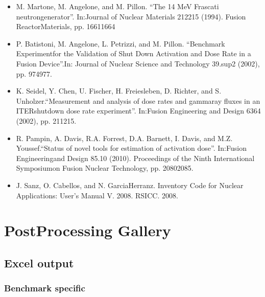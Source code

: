 \documentclass[letterpaper,10pt,english]{sphinxmanual}
\begin{document}
\begin{itemize}
\item {} 
M. Martone, M. Angelone, and M. Pillon. “The 14 MeV Frascati neutrongenerator”.
In:Journal of Nuclear Materials 212\sphinxhyphen{}215 (1994). Fusion ReactorMaterials, pp. 1661\textendash{}1664

\item {} 
P. Batistoni, M. Angelone, L. Petrizzi, and M. Pillon. “Benchmark Experimentfor the
Validation of Shut Down Activation and Dose Rate in a Fusion Device”.In: Journal of Nuclear
Science and Technology 39.sup2 (2002), pp. 974\textendash{}977.

\item {} 
K. Seidel, Y. Chen, U. Fischer, H. Freiesleben, D. Richter, and S. Unholzer.“Measurement
and analysis of dose rates and gamma\sphinxhyphen{}ray fluxes in an ITERshut\sphinxhyphen{}down dose rate experiment”.
In:Fusion Engineering and Design 63\sphinxhyphen{}64 (2002), pp. 211\textendash{}215.

\item {} 
R. Pampin, A. Davis, R.A. Forrest, D.A. Barnett, I. Davis, and M.Z. Youssef.“Status of novel
tools for estimation of activation dose”. In:Fusion Engineeringand Design 85.10 (2010).
Proceedings of the Ninth International Symposiumon Fusion Nuclear Technology, pp. 2080\textendash{}2085.

\item {} 
J. Sanz, O. Cabellos, and N. Garcia\sphinxhyphen{}Herranz. Inventory Code for Nuclear Applications:
User’s Manual V. 2008. RSICC. 2008.

\end{itemize}




\chapter{Post\sphinxhyphen{}Processing Gallery}
\label{\detokenize{usage/postprocessing:post-processing-gallery}}\label{\detokenize{usage/postprocessing::doc}}

\section{Excel output}
\label{\detokenize{usage/postprocessing:excel-output}}

\subsection{Benchmark specific}
\label{\detokenize{usage/postprocessing:benchmark-specific}}
\end{document}
